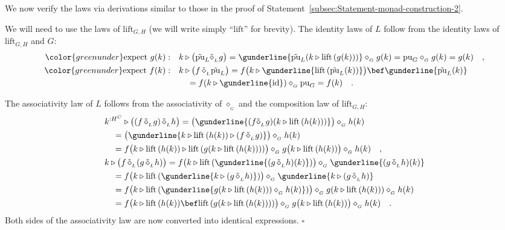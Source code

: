 We now verify the laws via derivations similar to those in the proof
of Statement~\ref{subsec:Statement-monad-construction-2}.

We will need to use the laws of $\text{lift}_{G,H}$ (we will write
simply \textsf{``}$\text{lift}$\textsf{''} for brevity). The identity laws of $L$
follow from the identity laws of $\text{lift}_{G,H}$ and $G$:
\begin{align*}
{\color{greenunder}\text{expect }g(k):}\quad & k\triangleright\big(\tilde{\text{pu}}_{L}\tilde{\diamond}_{_{L}}g\big)=\gunderline{\tilde{\text{pu}}_{L}(k\triangleright\text{lift}\,(g(k)))}\diamond_{_{G}}g(k)=\text{pu}_{G}\diamond_{_{G}}g(k)=g(k)\quad,\\
{\color{greenunder}\text{expect }f(k):}\quad & k\triangleright\big(f\,\tilde{\diamond}_{_{L}}\tilde{\text{pu}}_{L}\big)=f\big(k\triangleright\gunderline{\text{lift}\,(\tilde{\text{pu}}_{L}(k))}\big)\bef\gunderline{\tilde{\text{pu}}_{L}(k)}\\
 & \quad=f(k\triangleright\gunderline{\text{id}})\diamond_{_{G}}\text{pu}_{G}=f(k)\quad.
\end{align*}

The associativity law of $L$ follows from the associativity of $\diamond_{_{G}}$
and the composition law of $\text{lift}_{G,H}$:
\begin{align*}
 & k^{:H^{C}}\triangleright\big((f\,\tilde{\diamond}_{_{L}}g)\,\tilde{\diamond}_{_{L}}h\big)=\big(\gunderline{(f\tilde{\diamond}_{_{L}}g)(k\triangleright\text{lift}\,(h(k)))}\big)\diamond_{_{G}}h(k)\\
 & \quad=\big(\gunderline{k\triangleright\text{lift}\,(h(k))\triangleright(f\,\tilde{\diamond}_{_{L}}g)}\big)\diamond_{_{G}}h(k)\\
 & \quad=f\big(k\triangleright\text{lift}\,(h(k))\triangleright\text{lift}\,(g(k\triangleright\text{lift}\,(h(k))))\big)\diamond_{_{G}}g\big(k\triangleright\text{lift}\,(h(k))\big)\diamond_{_{G}}h(k)\quad,\\
 & k\triangleright\big(f\,\tilde{\diamond}_{_{L}}(g\,\tilde{\diamond}_{_{L}}h)\big)=f\big(k\triangleright\text{lift}\,(\gunderline{(g\,\tilde{\diamond}_{_{L}}h)(k)})\big)\diamond_{_{G}}\gunderline{(g\,\tilde{\diamond}_{_{L}}h)(k)}\\
 & \quad=f\big(k\triangleright\text{lift}\,(\gunderline{k\triangleright(g\,\tilde{\diamond}_{_{L}}h)})\big)\diamond_{_{G}}\gunderline{k\triangleright(g\,\tilde{\diamond}_{_{L}}h)}\\
 & \quad=f\big(k\triangleright\text{lift}\,(\gunderline{g(k\triangleright\text{lift}\,(h(k)))\diamond_{_{G}}h(k)})\big)\diamond_{_{G}}g(k\triangleright\text{lift}\,(h(k)))\diamond_{_{G}}h(k)\\
 & \quad=f\big(k\triangleright\text{lift}\,(h(k))\bef\text{lift}\,(g(k\triangleright\text{lift}\,(h(k))))\big)\diamond_{_{G}}g\big(k\triangleright\text{lift}\,(h(k))\big)\diamond_{_{G}}h(k)\quad.
\end{align*}
Both sides of the associativity law are now converted into identical
expressions. $\square$


